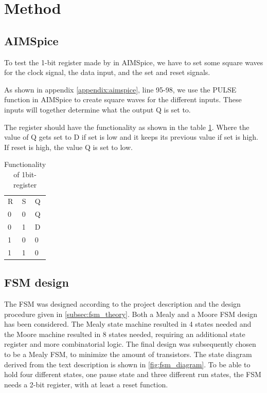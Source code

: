 \section{Method}
\label{sec:method}

\subsection{AIMSpice}
\label{subsec:aimspicemethod}

To test the 1-bit register made by in AIMSpice, we have to set some square waves for the clock signal, the data input, and the set and reset signals.

As shown in appendix \ref{appendix:aimspice}, line 95-98, we use the PULSE function in AIMSpice to create square waves for the different inputs. These inputs will together determine what the output Q is set to.

The register should have the functionality as shown in the table \ref{tab:registerFunc}. Where the value of Q gets set to D if set is low and it keeps its previous value if set is high. If reset is high, the value Q is set to low. 

\begin{table}[H]
\label{tab:registerFunc}
\centering
\caption{Functionality of 1bit-register}
\begin{tabular}{|l|l|l|}
\cline{1-3}
R & S & Q  \\ \cline{1-3}
0 & 0 & Q  \\ \cline{1-3}
0 & 1 & D  \\ \cline{1-3}
1 & 0 & 0  \\ \cline{1-3}
1 & 1 & 0  \\ \cline{1-3}
\end{tabular}
\end{table}

\subsection{FSM design}

The FSM was designed according to the project description and the design procedure given in \autoref{subsec:fsm_theory}. Both a Mealy and a Moore FSM design has been considered. The Mealy state machine resulted in 4 states needed and the Moore machine resulted in 8 states needed, requiring an additional state register and more combinatorial logic. The final design was subsequently chosen to be a Mealy FSM, to minimize the amount of transistors. The state diagram derived from the text description is shown in \autoref{fig:fsm_diagram}. To be able to hold four different states, one pause state and three different run states, the FSM needs a 2-bit register, with at least a reset function. 

